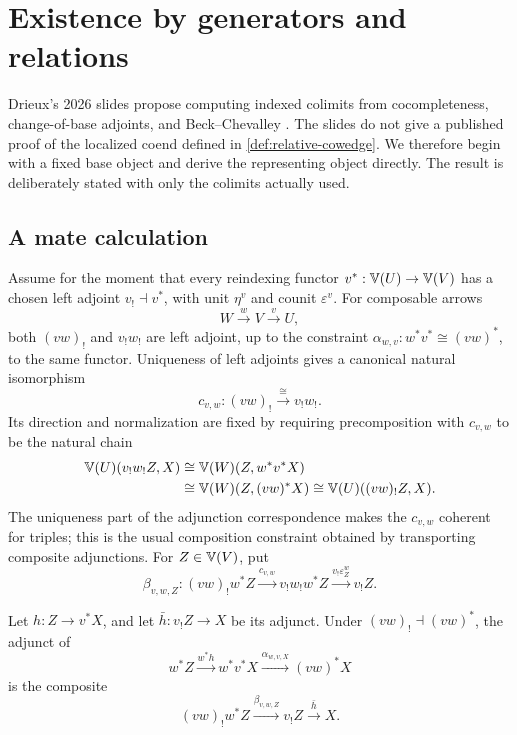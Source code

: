 \section{Existence by generators and relations}
\label{sec:fixed-base-existence}

Drieux's 2026 slides propose computing indexed colimits from cocompleteness,
change-of-base adjoints, and Beck--Chevalley
\cite[logical slides~17--18]{Drieux2026TACL}.  The slides do not give a
published proof of the localized coend defined in
\cref{def:relative-cowedge}.  We therefore begin with a fixed base object and
derive the representing object directly.  The result is deliberately stated
with only the colimits actually used.

\subsection{A mate calculation}

Assume for the moment that every reindexing functor
\(v^*:\mathbb{V}(U)\to\mathbb{V}(V)\) has a chosen left adjoint
\(v_!\dashv v^*\), with unit \(\eta^v\) and counit \(\varepsilon^v\).
For composable arrows
\[
  W\xrightarrow{w}V\xrightarrow{v}U,
\]
both \((vw)_!\) and \(v_!w_!\) are left adjoint, up to the constraint
\(\alpha_{w,v}:w^*v^*\cong(vw)^*\), to the same functor.  Uniqueness of
left adjoints gives a canonical natural isomorphism
\[
  c_{v,w}:(vw)_!\xrightarrow{\ \cong\ }v_!w_!.
\]
Its direction and normalization are fixed by requiring precomposition with
\(c_{v,w}\) to be the natural chain
\[
\begin{split}
  \mathbb{V}(U)(v_!w_!Z,X)
  &\cong\mathbb{V}(W)(Z,w^*v^*X)\\
  &\cong\mathbb{V}(W)(Z,(vw)^*X)
  \cong\mathbb{V}(U)((vw)_!Z,X).
\end{split}
\]
The uniqueness part of the adjunction correspondence makes the \(c_{v,w}\)
coherent for triples; this is the usual composition constraint obtained by
transporting composite adjunctions.
For \(Z\in\mathbb{V}(V)\), put
\begin{equation}
  \beta_{v,w,Z}:
  (vw)_!w^*Z\xrightarrow{c_{v,w}}
  v_!w_!w^*Z\xrightarrow{v_!\varepsilon^w_Z}v_!Z.
  \label{eq:beta-mate}
\end{equation}

\begin{lemma}
\label{lem:base-mate}
Let \(h:Z\to v^*X\), and let
\(\bar h:v_!Z\to X\) be its adjunct.  Under
\((vw)_!\dashv(vw)^*\), the adjunct of
\[
  w^*Z\xrightarrow{w^*h}w^*v^*X
  \xrightarrow{\alpha_{w,v,X}}(vw)^*X
\]
is the composite
\[
  (vw)_!w^*Z\xrightarrow{\beta_{v,w,Z}}v_!Z
  \xrightarrow{\bar h}X.
\]
\end{lemma}

